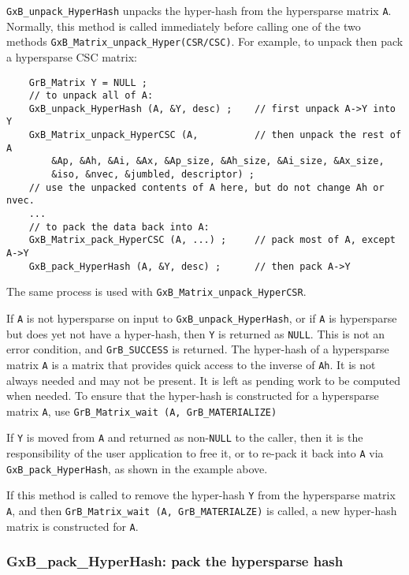 \documentclass[12pt]{article}
\begin{document}
\verb'GxB_unpack_HyperHash' unpacks the hyper-hash from the hypersparse matrix
\verb'A'.  Normally, this method is called immediately before calling one of
the two methods \verb'GxB_Matrix_unpack_Hyper(CSR/CSC)'.  For example, to
unpack then pack a hypersparse CSC matrix:

    {\footnotesize
    \begin{verbatim}
    GrB_Matrix Y = NULL ;
    // to unpack all of A:
    GxB_unpack_HyperHash (A, &Y, desc) ;    // first unpack A->Y into Y
    GxB_Matrix_unpack_HyperCSC (A,          // then unpack the rest of A
        &Ap, &Ah, &Ai, &Ax, &Ap_size, &Ah_size, &Ai_size, &Ax_size,
        &iso, &nvec, &jumbled, descriptor) ;
    // use the unpacked contents of A here, but do not change Ah or nvec.
    ...
    // to pack the data back into A:
    GxB_Matrix_pack_HyperCSC (A, ...) ;     // pack most of A, except A->Y 
    GxB_pack_HyperHash (A, &Y, desc) ;      // then pack A->Y \end{verbatim}}

The same process is used with \verb'GxB_Matrix_unpack_HyperCSR'.

If \verb'A' is not hypersparse on input to \verb'GxB_unpack_HyperHash', or if
\verb'A' is hypersparse but does yet not have a hyper-hash, then \verb'Y' is
returned as \verb'NULL'.  This is not an error condition, and
\verb'GrB_SUCCESS' is returned.  The hyper-hash of a hypersparse matrix
\verb'A' is a matrix that provides quick access to the inverse of \verb'Ah'.
It is not always needed and may not be present.  It is left as pending work to
be computed when needed.  To ensure that the hyper-hash is constructed for a
hypersparse matrix \verb'A', use \verb'GrB_Matrix_wait (A, GrB_MATERIALIZE)' 

If \verb'Y' is moved from \verb'A' and returned as non-\verb'NULL' to the
caller, then it is the responsibility of the user application to free it, or to
re-pack it back into \verb'A' via \verb'GxB_pack_HyperHash', as shown in the
example above.

If this method is called to remove the hyper-hash \verb'Y' from the hypersparse
matrix \verb'A', and then \verb'GrB_Matrix_wait (A, GrB_MATERIALZE)' is called,
a new hyper-hash matrix is constructed for \verb'A'.

\newpage
\subsubsection{{\sf GxB\_pack\_HyperHash:} pack the hypersparse hash}
\label{pack_hyperhash}
\end{document}
